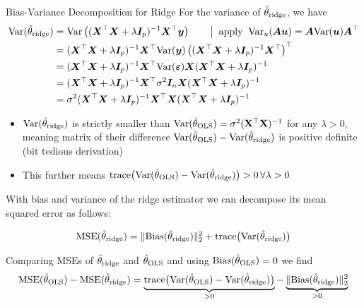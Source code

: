 \documentclass[11pt,compress,t,notes=noshow, xcolor=table]{beamer}
\begin{document}
\begin{vbframe}{Bias-Variance Decomposition for Ridge}
    For the variance of $\hat{\theta}_{\text{ridge}}$, we have
    \begin{equation*}
        \begin{aligned}
            \text{Var}(\hat{\theta}_{\text{ridge}})  &= \text{Var}\left((\bm{X}^{\top}\bm{X} +\lambda\bm{I}_p )^{-1} \bm{X}^{\top}\bm{y}\right) \quad \quad \big| \;\; \text{apply} \;\; \text{Var}_u(\bm{A}\bm{u}) = \bm{A} \text{Var}(\bm{u}) \bm{A}^{\top} \\
            &= (\bm{X}^{\top}\bm{X} +\lambda\bm{I}_p )^{-1} \bm{X}^{\top} \text{Var}(\bm{y}) \left( (\bm{X}^{\top}\bm{X} +\lambda\bm{I}_p )^{-1} \bm{X}^{\top} \right)^{\top} \\
            &= (\bm{X}^{\top}\bm{X} +\lambda\bm{I}_p )^{-1} \bm{X}^{\top} \text{Var}(\bm{\varepsilon}) \bm{X} (\bm{X}^{\top}\bm{X} +\lambda\bm{I}_p )^{-1}  \\
            &=  (\bm{X}^{\top}\bm{X} +\lambda\bm{I}_p )^{-1} \bm{X}^{\top} \sigma^2 \bm{I}_n \bm{X} (\bm{X}^{\top}\bm{X} +\lambda\bm{I}_p )^{-1}  \\
            &= \sigma^2 (\bm{X}^{\top}\bm{X} +\lambda\bm{I}_p )^{-1} \bm{X}^{\top} \bm{X} (\bm{X}^{\top}\bm{X} +\lambda\bm{I}_p )^{-1}  \\
        \end{aligned}
    \end{equation*}

\begin{itemize}
    \item $\text{Var}(\hat{\theta}_{\text{ridge}})$ is strictly smaller than $\text{Var}(\hat{\theta}_{\text{OLS}})=\sigma^2 (\mathbf{X}^{\top}\mathbf{X})^{-1}$ for any $\lambda>0$, meaning matrix of their difference $\text{Var}(\hat{\theta}_{\text{OLS}})-\text{Var}(\hat{\theta}_{\text{ridge}})$ is positive definite (bit tedious derivation)
    \item This further means $\text{trace}\big({\text{Var}(\hat{\theta}_{\text{OLS}})}-{\text{Var}(\hat{\theta}_{\text{ridge}})}\big)>0 \, \forall \lambda>0$
\end{itemize}

\framebreak

With bias and variance of the ridge estimator we can decompose its mean squared error as follows:

$$\text{MSE}(\hat{\theta}_{\text{ridge}})=\Vert \text{Bias}(\hat{\theta}_{\text{ridge}})\Vert_2^2 + \text{trace}\big(\text{Var}(\hat{\theta}_{\text{ridge}})\big)$$

Comparing MSEs of $\hat{\theta}_{\text{ridge}}$ and $\hat{\theta}_{\text{OLS}}$ and using $\text{Bias}(\hat{\theta}_{\text{OLS}})=0$ we find 
$$\text{MSE}(\hat{\theta}_{\text{OLS}})-\text{MSE}(\hat{\theta}_{\text{ridge}}) = \underbrace{\text{trace}\big({\text{Var}(\hat{\theta}_{\text{OLS}})}-{\text{Var}(\hat{\theta}_{\text{ridge}})}\big)}_{>0} - \underbrace{\Vert \text{Bias}(\hat{\theta}_{\text{ridge}})\Vert_2^2}_{>0}$$


\end{vbframe}
\end{document}
